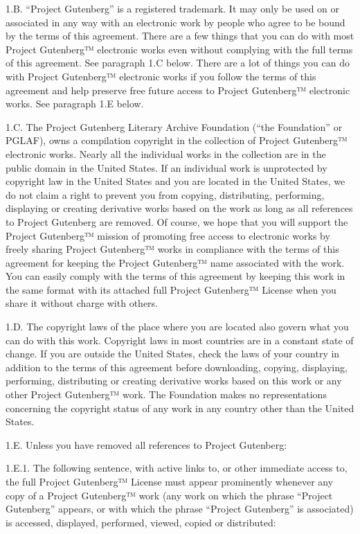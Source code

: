 1.B. “Project Gutenberg” is a registered trademark. It may only be
used on or associated in any way with an electronic work by people who
agree to be bound by the terms of this agreement. There are a few
things that you can do with most Project Gutenberg™ electronic works
even without complying with the full terms of this agreement. See
paragraph 1.C below. There are a lot of things you can do with Project
Gutenberg™ electronic works if you follow the terms of this
agreement and help preserve free future access to Project Gutenberg™
electronic works. See paragraph 1.E below.

1.C. The Project Gutenberg Literary Archive Foundation (“the
Foundation” or PGLAF), owns a compilation copyright in the collection
of Project Gutenberg™ electronic works. Nearly all the individual
works in the collection are in the public domain in the United
States. If an individual work is unprotected by copyright law in the
United States and you are located in the United States, we do not
claim a right to prevent you from copying, distributing, performing,
displaying or creating derivative works based on the work as long as
all references to Project Gutenberg are removed. Of course, we hope
that you will support the Project Gutenberg™ mission of promoting
free access to electronic works by freely sharing Project Gutenberg™
works in compliance with the terms of this agreement for keeping the
Project Gutenberg™ name associated with the work. You can easily
comply with the terms of this agreement by keeping this work in the
same format with its attached full Project Gutenberg™ License when
you share it without charge with others.

1.D. The copyright laws of the place where you are located also govern
what you can do with this work. Copyright laws in most countries are
in a constant state of change. If you are outside the United States,
check the laws of your country in addition to the terms of this
agreement before downloading, copying, displaying, performing,
distributing or creating derivative works based on this work or any
other Project Gutenberg™ work. The Foundation makes no
representations concerning the copyright status of any work in any
country other than the United States.

1.E. Unless you have removed all references to Project Gutenberg:

1.E.1. The following sentence, with active links to, or other
immediate access to, the full Project Gutenberg™ License must appear
prominently whenever any copy of a Project Gutenberg™ work (any work
on which the phrase “Project Gutenberg” appears, or with which the
phrase “Project Gutenberg” is associated) is accessed, displayed,
performed, viewed, copied or distributed:

